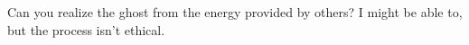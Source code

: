 

Can you realize the ghost from the energy provided by others?  I might
be able to, but the process isn't ethical.

\bye

